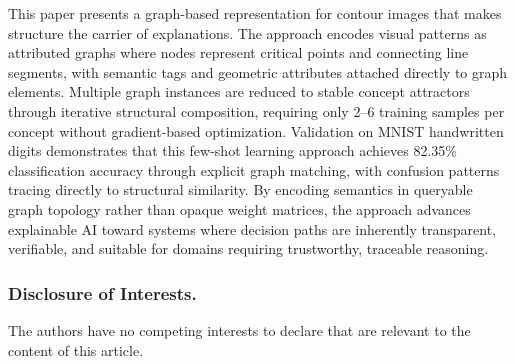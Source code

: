 \documentclass[runningheads]{llncs}
\begin{document}
This paper presents a graph-based representation for contour images that makes structure the carrier of explanations. The approach encodes visual patterns as attributed graphs where nodes represent critical points and connecting line segments, with semantic tags and geometric attributes attached directly to graph elements. Multiple graph instances are reduced to stable concept attractors through iterative structural composition, requiring only 2--6 training samples per concept without gradient-based optimization. Validation on MNIST handwritten digits demonstrates that this few-shot learning approach achieves 82.35\% classification accuracy through explicit graph matching, with confusion patterns tracing directly to structural similarity. By encoding semantics in queryable graph topology rather than opaque weight matrices, the approach advances explainable AI toward systems where decision paths are inherently transparent, verifiable, and suitable for domains requiring trustworthy, traceable reasoning.

\subsubsection*{Disclosure of Interests.}
The authors have no competing interests to declare that are relevant to the content of this article.



\end{document}
